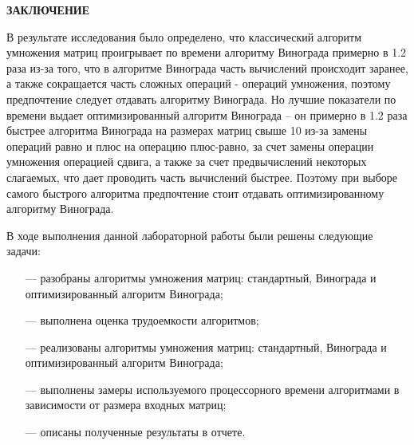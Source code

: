 \begin{center}
    \textbf{ЗАКЛЮЧЕНИЕ}
\end{center}

В результате исследования было определено, что классический алгоритм умножения матриц проигрывает по времени алгоритму Винограда примерно в 1.2 раза из-за того, что в алгоритме Винограда часть вычислений происходит заранее, а также сокращается часть сложных операций - операций умножения, поэтому предпочтение следует отдавать алгоритму Винограда. Но лучшие показатели по времени выдает оптимизированный алгоритм Винограда -- он примерно в 1.2 раза быстрее алгоритма Винограда на размерах матриц свыше 10 из-за замены операций равно и плюс на операцию плюс-равно, за счет замены операции умножения операцией сдвига, а также за счет предвычислений некоторых слагаемых, что дает проводить часть вычислений быстрее. Поэтому при выборе самого быстрого алгоритма предпочтение стоит отдавать оптимизированному алгоритму Винограда.


В ходе выполнения данной лабораторной работы были решены следующие задачи:
\begin{itemize} 
    \item[---] разобраны алгоритмы умножения матриц: стандартный, Винограда и оптимизированный алгоритм Винограда; 
    \item[---] выполнена оценка трудоемкости алгоритмов; 
    \item[---] реализованы алгоритмы умножения матриц: стандартный, Винограда и оптимизированный алгоритм Винограда; 
    \item[---] выполнены замеры используемого процессорного времени алгоритмами в зависимости от размера входных матриц; 
    \item[---] описаны полученные результаты в отчете. 
\end{itemize}